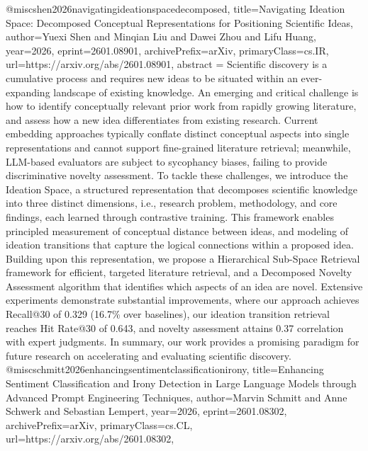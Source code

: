 {}@misc{shen2026navigatingideationspacedecomposed,
      title={Navigating Ideation Space: Decomposed Conceptual Representations for Positioning Scientific Ideas}, 
      author={Yuexi Shen and Minqian Liu and Dawei Zhou and Lifu Huang},
      year={2026},
      eprint={2601.08901},
      archivePrefix={arXiv},
      primaryClass={cs.IR},
      url={https://arxiv.org/abs/2601.08901},
      abstract = {Scientific discovery is a cumulative process and requires new ideas to be situated within an ever-expanding landscape of existing knowledge. An emerging and critical challenge is how to identify conceptually relevant prior work from rapidly growing literature, and assess how a new idea differentiates from existing research. Current embedding approaches typically conflate distinct conceptual aspects into single representations and cannot support fine-grained literature retrieval; meanwhile, LLM-based evaluators are subject to sycophancy biases, failing to provide discriminative novelty assessment. To tackle these challenges, we introduce the Ideation Space, a structured representation that decomposes scientific knowledge into three distinct dimensions, i.e., research problem, methodology, and core findings, each learned through contrastive training. This framework enables principled measurement of conceptual distance between ideas, and modeling of ideation transitions that capture the logical connections within a proposed idea. Building upon this representation, we propose a Hierarchical Sub-Space Retrieval framework for efficient, targeted literature retrieval, and a Decomposed Novelty Assessment algorithm that identifies which aspects of an idea are novel. Extensive experiments demonstrate substantial improvements, where our approach achieves Recall@30 of 0.329 (16.7\% over baselines), our ideation transition retrieval reaches Hit Rate@30 of 0.643, and novelty assessment attains 0.37 correlation with expert judgments. In summary, our work provides a promising paradigm for future research on accelerating and evaluating scientific discovery.}
}@misc{schmitt2026enhancingsentimentclassificationirony,
      title={Enhancing Sentiment Classification and Irony Detection in Large Language Models through Advanced Prompt Engineering Techniques}, 
      author={Marvin Schmitt and Anne Schwerk and Sebastian Lempert},
      year={2026},
      eprint={2601.08302},
      archivePrefix={arXiv},
      primaryClass={cs.CL},
      url={https://arxiv.org/abs/2601.08302},
}
